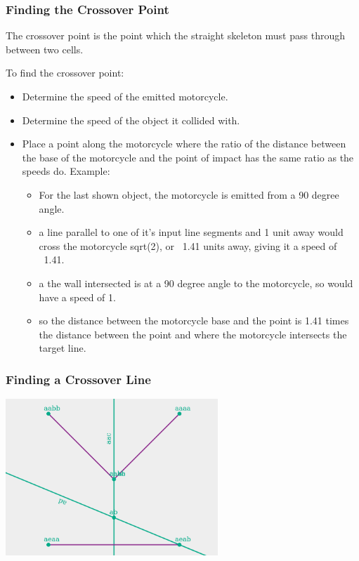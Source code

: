 \documentclass[hyperref={pdfpagemode=FullScreen},aspectratio=169]{beamer}
\begin{document}
\begin{frame}
  \frametitle{Finding the Crossover Point}
  The crossover point is the point which the straight skeleton must pass through between two cells.\par
  To find the crossover point:
  \begin{itemize}
  \item Determine the speed of the emitted motorcycle.
  \item Determine the speed of the object it collided with.
  \item Place a point along the motorcycle where the ratio of the distance between the base of the motorcycle and the point of impact has the same ratio as the speeds do.
  Example:
    \begin{itemize}
    \item For the last shown object, the motorcycle is emitted from a 90 degree angle.
    \item a line parallel to one of it's input line segments and 1 unit away would cross the motorcycle sqrt(2), or ~1.41 units away, giving it a speed of ~1.41.
    \item a the wall intersected is at a 90 degree angle to the motorcycle, so would have a speed of 1.
    \item so the distance between the motorcycle base and the point is 1.41 times the distance between the point and where the motorcycle intersects the target line.
    \end{itemize}
  \end{itemize}
\end{frame}
    
\begin{frame}
  \frametitle{Finding a Crossover Line}
  \includegraphics[width=0.6\textwidth, center]{C3-motorcycle-left_line-nogrid.png}
\end{frame}
\end{document}
